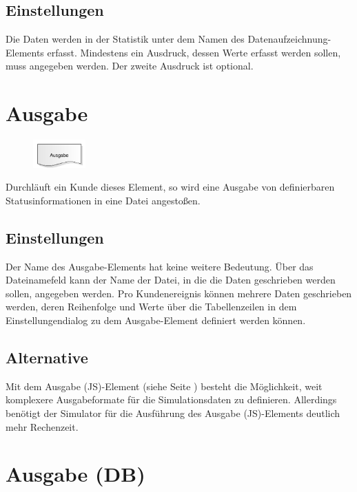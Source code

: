 \subsection*{Einstellungen}

Die Daten werden in der Statistik unter dem Namen des Datenaufzeichnung-Elements erfasst. Mindestens
ein Ausdruck, dessen Werte erfasst werden sollen, muss angegeben werden. Der zweite Ausdruck ist
optional.


\section{Ausgabe}
\label{ref:ModelElementOutput}

\begin{figure}
\vspace{-22pt}
\includegraphics[width=2cm]{imageModelElementOutput.png}
\vspace{-22pt}
\end{figure}

Durchläuft ein Kunde dieses Element, so wird eine Ausgabe von definierbaren Statusinformationen in eine
Datei angestoßen.

\subsection*{Einstellungen}

Der Name des Ausgabe-Elements hat keine weitere Bedeutung. Über das Dateinamefeld kann der Name der Datei,
in die die Daten geschrieben werden sollen, angegeben werden. Pro Kundenereignis können mehrere Daten
geschrieben werden, deren Reihenfolge und Werte über die Tabellenzeilen in dem Einstellungendialog zu
dem Ausgabe-Element definiert werden können.

\subsection*{Alternative}

Mit dem Ausgabe (JS)-Element (siehe Seite \pageref{ref:ModelElementOutputJS}) besteht die Möglichkeit, weit komplexere
Ausgabeformate für die Simulationsdaten zu definieren. Allerdings benötigt der Simulator für die Ausführung
des Ausgabe (JS)-Elements deutlich mehr Rechenzeit.


\section{Ausgabe (DB)}
\label{ref:ModelElementOutputDB}

